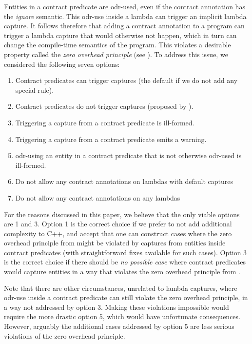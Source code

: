 Entities in a contract predicate are odr-used, even if the contract annotation has the \emph{ignore} semantic. This odr-use inside a lambda can trigger an implicit lambda capture. It follows therefore that adding a contract annotation to a program can trigger a lambda capture that would otherwise not happen, which in turn can change the compile-time semantics of the program. This violates a desirable property called the \emph{zero overhead principle} (see \cite{P2932R2}). To address this issue, we considered the following seven options:

\pagebreak %

\begin{enumerate}
\item Contract predicates can trigger captures (the default if we do not add any special rule).
\item Contract predicates do not trigger captures (proposed by \cite{P2932R2}).
\item Triggering a capture from a contract predicate is ill-formed.
\item Triggering a capture from a contract predicate emits a warning.
\item odr-using an entity in a contract predicate that is not otherwise odr-used is ill-formed.
\item Do not allow any contract annotations on lambdas with default captures
\item Do not allow any contract annotations on any lambdas
\end{enumerate}

For the reasons discussed in this paper, we believe that the only viable options are 1 and 3. Option 1 is the correct choice if we prefer to not add additional complexity to C++, and accept that one can construct cases where the zero overhead principle from \cite{P2932R2} might be violated by captures from entities inside contract predicates (with straightforward fixes available for such cases). Option 3 is the correct choice if there should be \emph{no possible case} where contract predicates would capture entities in a way that violates the zero overhead principle from \cite{P2932R2}.

Note that there are other circumstances, unrelated to lambda captures, where odr-use inside a contract predicate can still violate the zero overhead principle, in a way not addressed by option 3. Making these violations impossible would require the more drastic option 5, which would have unfortunate consequences. However, arguably the additional cases addressed by option 5 are less serious violations of the zero overhead principle.

